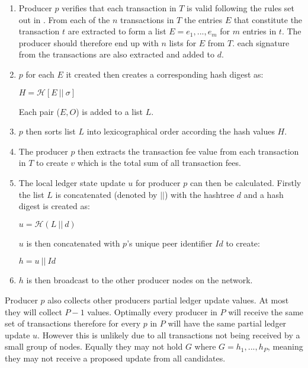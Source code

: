 \documentclass{article}
\begin{document}
\begin{enumerate}
\item Producer $p$ verifies that each transaction in $T$ is valid following the rules set out in \cite{transactionvalidator}. From each of the $n$ transactions in $T$ the entries $E$ that constitute the transaction $t$ are extracted to form a list $E = e_1,...,e_m$ for $m$ entries in $t$. The producer should therefore end up with $n$ lists for $E$ from $T$. each signature from the transactions are also extracted and added to $d$.

\item $p$ for each $E$ it created then creates a corresponding hash digest as: 
\begin{center}
$H = \mathcal{H}[E~||~\sigma]$
\end{center}

Each pair ($E,O$) is added to a list $L$. 

\item $p$ then sorts list $L$ into lexicographical order according the hash values $H$.

\item The producer $p$ then extracts the transaction fee value from each transaction in $T$ to create $v$ which is the total sum of all transaction fees. 

\item The local ledger state update $u$ for producer $p$ can then be calculated. Firstly the list $L$ is concatenated (denoted by $||$) with the hashtree $d$ and a hash digest is created as: 

\begin{center}
$u = \mathcal{H}(L~||~d)$
\end{center}  

$u$ is then concatenated with $p$'s unique peer identifier $Id$ to create:

\begin{center} 
$h = u ~||~Id$
\end{center}

\item $h$ is then broadcast to the other producer nodes on the network. 
\end{enumerate}



Producer $p$ also collects other producers partial ledger update values. At most they will collect $P-1$ values. Optimally every producer in $P$ will receive the same set of transactions therefore for every $p$ in $P$ will have the same partial ledger update $u$. However this is unlikely due to all transactions not being received by a small group of nodes. Equally they may not hold $G$ where $G = h_1,...,h_P$, meaning they may not receive a proposed update from all candidates. 
\end{document}
